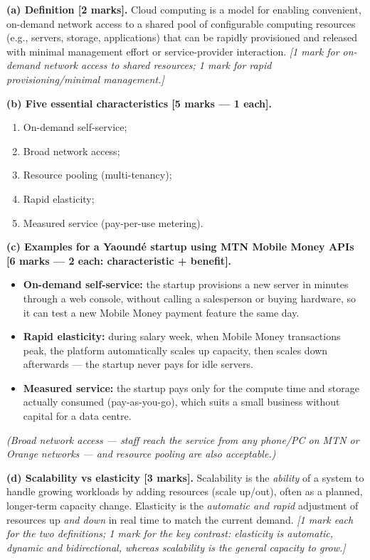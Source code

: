 \documentclass[11pt]{article}
\newcommand{\cle}[1]{{\popxbold\color{popdark}#1}}
\begin{document}
\begin{corrige}
\textbf{(a) Definition [2 marks].} Cloud computing is a model for enabling convenient, on-demand network access to a shared pool of configurable computing resources (e.g., servers, storage, applications) that can be rapidly provisioned and released with minimal management effort or service-provider interaction. \emph{[1 mark for on-demand network access to shared resources; 1 mark for rapid provisioning/minimal management.]}

\textbf{(b) Five essential characteristics [5 marks — 1 each].}
\begin{enumerate}
\item On-demand self-service;
\item Broad network access;
\item Resource pooling (multi-tenancy);
\item Rapid elasticity;
\item Measured service (pay-per-use metering).
\end{enumerate}

\textbf{(c) Examples for a Yaoundé startup using MTN Mobile Money APIs [6 marks — 2 each: characteristic + benefit].}
\begin{itemize}
\item \textbf{On-demand self-service:} the startup provisions a new server in minutes through a web console, without calling a salesperson or buying hardware, so it can test a new Mobile Money payment feature the same day.
\item \textbf{Rapid elasticity:} during salary week, when Mobile Money transactions peak, the platform automatically scales up capacity, then scales down afterwards — the startup never pays for idle servers.
\item \textbf{Measured service:} the startup pays only for the compute time and storage actually consumed (pay-as-you-go), which suits a small business without capital for a data centre.
\end{itemize}
\emph{(Broad network access — staff reach the service from any phone/PC on MTN or Orange networks — and resource pooling are also acceptable.)}

\textbf{(d) Scalability vs elasticity [3 marks].} \cle{Scalability} is the \emph{ability} of a system to handle growing workloads by adding resources (scale up/out), often as a planned, longer-term capacity change. \cle{Elasticity} is the \emph{automatic and rapid} adjustment of resources up \emph{and down} in real time to match the current demand. \emph{[1 mark each for the two definitions; 1 mark for the key contrast: elasticity is automatic, dynamic and bidirectional, whereas scalability is the general capacity to grow.]}
\end{corrige}
\end{document}
